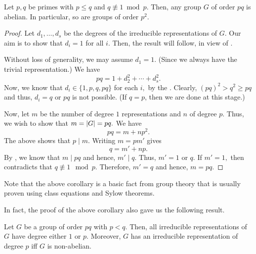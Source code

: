 \begin{cor}
	Let $p, q$ be primes with $p \le q$ and $q \not\equiv 1 \bmod p.$ Then, any group $G$ of order $pq$ is abelian. In particular, so are groups of order $p^2.$
\end{cor}
\begin{proof} 
	Let $d_1, \ldots, d_s$ be the degrees of the irreducible representations of $G.$ Our aim is to show that $d_i = 1$ for all $i.$ Then, the result will follow, in view of . 

	Without loss of generality, we may assume $d_1 = 1.$ (Since we always have the trivial representation.) We have
	\begin{equation*} 
		pq = 1 + d_2^2 + \cdots + d_s^2.
	\end{equation*}
	Now, we know that $d_i \in \{1, p, q, pq\}$ for each $i,$ by the . Clearly, $(pq)^2 > q^2 \ge pq$ and thus, $d_i = q$ or $pq$ is not possible. (If $q = p$, then we are done at this stage.) 

	Now, let $m$ be the number of degree $1$ representations and $n$ of degree $p.$ Thus, we wish to show that $m = {\left\lvert G \right\lvert} = pq.$ We have
	\begin{equation*} 
		pq = m + np^2.
	\end{equation*}
	The above shows that $p \mid m.$ Writing $m = pm'$ gives
	\begin{equation} \tag{$*$} \label{eq:011}
		q = m' + np.
	\end{equation}
	By , we know that $m \mid pq$ and hence, $m' \mid q.$ Thus, $m' = 1$ or $q.$ If $m' = 1,$ then  contradicts that $q \not\equiv 1 \mod p.$ Therefore, $m' = q$ and hence, $m = pq.$
\end{proof}

\begin{rem}
	Note that the above corollary is a basic fact from group theory that is usually proven using class equations and Sylow theorems.
\end{rem}

In fact, the proof of the above corollary also gave us the following result.

\begin{cor}
	Let $G$ be a group of order $pq$ with $p < q.$ Then, all irreducible representations of $G$ have degree either $1$ or $p.$ Moreover, $G$ has an irreducible representation of degree $p$ iff $G$ is non-abelian.
\end{cor}

